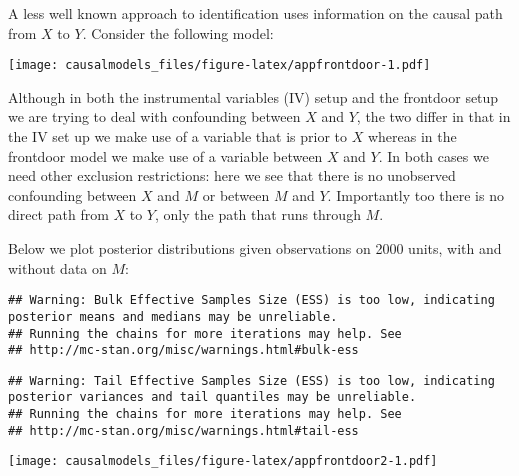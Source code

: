 \documentclass[
  12pt,
]{book}
\newenvironment{Shaded}{\begin{snugshade}}{\end{snugshade}}
\newcommand{\DataTypeTok}[1]{\textcolor[rgb]{0.13,0.29,0.53}{#1}}
\newcommand{\KeywordTok}[1]{\textcolor[rgb]{0.13,0.29,0.53}{\textbf{#1}}}
\newcommand{\NormalTok}[1]{#1}
\newcommand{\OperatorTok}[1]{\textcolor[rgb]{0.81,0.36,0.00}{\textbf{#1}}}
\newcommand{\StringTok}[1]{\textcolor[rgb]{0.31,0.60,0.02}{#1}}
\begin{document}
A less well known approach to identification uses information on the causal path from \(X\) to \(Y\). Consider the following model:

\begin{Shaded}
\end{Shaded}

\texttt{[image: causalmodels\_files/figure-latex/appfrontdoor-1.pdf]}

Although in both the instrumental variables (IV) setup and the frontdoor setup we are trying to deal with confounding between \(X\) and \(Y\), the two differ in that in the IV set up we make use of a variable that is prior to \(X\) whereas in the frontdoor model we make use of a variable between \(X\) and \(Y\). In both cases we need other exclusion restrictions: here we see that there is no unobserved confounding between \(X\) and \(M\) or between \(M\) and \(Y\). Importantly too there is no direct path from \(X\) to \(Y\), only the path that runs through \(M\).

Below we plot posterior distributions given observations on 2000 units, with and without data on \(M\):

\begin{verbatim}
## Warning: Bulk Effective Samples Size (ESS) is too low, indicating posterior means and medians may be unreliable.
## Running the chains for more iterations may help. See
## http://mc-stan.org/misc/warnings.html#bulk-ess
\end{verbatim}

\begin{verbatim}
## Warning: Tail Effective Samples Size (ESS) is too low, indicating posterior variances and tail quantiles may be unreliable.
## Running the chains for more iterations may help. See
## http://mc-stan.org/misc/warnings.html#tail-ess
\end{verbatim}

\texttt{[image: causalmodels\_files/figure-latex/appfrontdoor2-1.pdf]}
\end{document}
